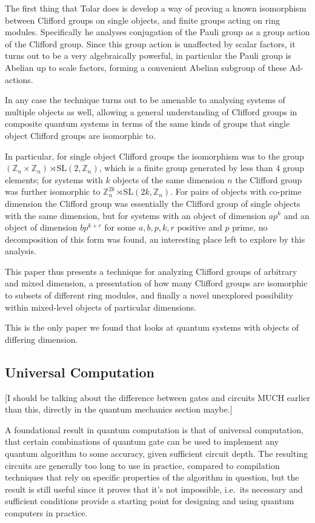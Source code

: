 The first thing that Tolar does is develop a way of proving a known isomorphism between Clifford groups on single objects, and finite groups acting on ring modules. Specifically he analyses conjugation of the Pauli group as a group action of the Clifford group. Since this group action is unaffected by scalar factors, it turns out to be a very algebraically powerful, in particular the Pauli group is Abelian up to scale factors, forming a convenient Abelian subgroup of these Ad-actions.

In any case the technique turns out to be amenable to analysing systems of multiple objects as well, allowing a general understanding of Clifford groups in composite quantum systems in terms of the same kinds of groups that single object Clifford groups are isomorphic to.

In particular, for single object Clifford groups the isomorphism was to the group $(\mathbb{Z}_n\times\mathbb{Z}_n)\rtimes\text{SL}(2,\mathbb{Z}_n)$, which is a finite group generated by less than $4$ group elements; for systems with $k$ objects of the same dimension $n$ the Clifford group was further isomorphic to $\mathbb{Z}_n^{2k}\rtimes\text{SL}(2k, \mathbb{Z}_n)$. For pairs of objects with co-prime dimension the Clifford group was essentially the Clifford group of single objects with the same dimension, but for systems with an object of dimension $ap^k$ and an object of dimension $bp^{k+r}$ for some $a, b, p, k, r$ positive and $p$ prime, no decomposition of this form was found, an interesting place left to explore by this analysis.

This paper thus presents a technique for analyzing Clifford groups of arbitrary and mixed dimension, a presentation of how many Clifford groups are isomorphic to subsets of different ring modules, and finally a novel unexplored possibility within mixed-level objects of particular dimensions.

This is the only paper we found that looks at quantum systems with objects of differing dimension.

\subsection{Universal Computation}
[I should be talking about the difference between gates and circuits MUCH earlier than this, directly in the quantum mechanics section maybe.]

A foundational result in quantum computation is that of universal computation, that certain combinations of quantum gate can be used to implement any quantum algorithm to some accuracy, given sufficient circuit depth. The resulting circuits are generally too long to use in practice, compared to compilation techniques that rely on specific properties of the algorithm in question, but the result is still useful since it proves that it's not impossible, i.e.\ its necessary and sufficient conditions provide a starting point for designing and using quantum computers in practice.

